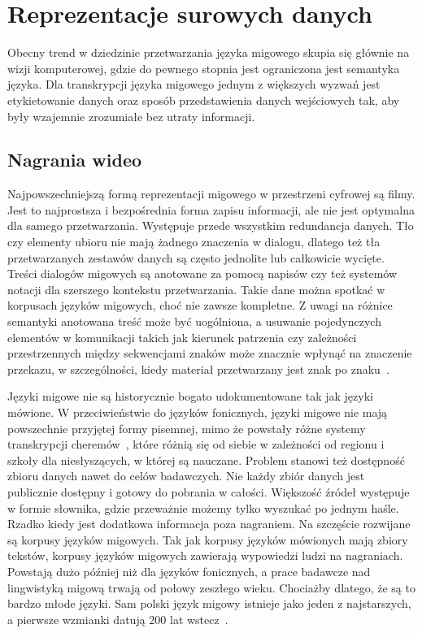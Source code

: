 \section{Reprezentacje surowych danych}
\label{sec:raw-data-representations}

Obecny trend w dziedzinie przetwarzania języka migowego skupia się głównie na wizji komputerowej, gdzie do pewnego stopnia jest ograniczona jest semantyka języka. Dla transkrypcji języka migowego jednym z większych wyzwań jest etykietowanie danych oraz sposób przedstawienia danych wejściowych tak, aby były wzajemnie zrozumiałe bez utraty informacji.

\subsection{Nagrania wideo}
\label{subsec:video-recordings}

Najpowszechniejszą formą reprezentacji migowego w przestrzeni cyfrowej są filmy. Jest to najprostsza i bezpośrednia forma zapisu informacji, ale nie jest optymalna dla samego przetwarzania. Występuje przede wszystkim redundancja danych. Tło czy elementy ubioru nie mają żadnego znaczenia w dialogu, dlatego też tła przetwarzanych zestawów danych są często jednolite lub całkowicie wycięte. Treści dialogów migowych są anotowane za pomocą napisów czy też systemów notacji dla szerszego kontekstu przetwarzania. Takie dane można spotkać w korpusach języków migowych, choć nie zawsze kompletne. Z uwagi na różnice semantyki anotowana treść może być uogólniona, a usuwanie pojedynczych elementów w komunikacji takich jak kierunek patrzenia czy zależności przestrzennych między sekwencjami znaków może znacznie wpłynąć na znaczenie przekazu, w szczególności, kiedy materiał przetwarzany jest znak po znaku~\cite{yin2020}.

Języki migowe nie są historycznie bogato udokumentowane tak jak języki mówione. W przeciwieństwie do języków fonicznych, języki migowe nie mają powszechnie przyjętej formy pisemnej, mimo że powstały różne systemy transkrypcji cheremów~\cite{stokoe1966}, które różnią się od siebie w zależności od regionu i szkoły dla niesłyszących, w której są nauczane. Problem stanowi też dostępność zbioru danych nawet do celów badawczych. Nie każdy zbiór danych jest publicznie dostępny i gotowy do pobrania w całości. Większość źródeł występuje w formie słownika, gdzie przeważnie możemy tylko wyszukać po jednym haśle. Rzadko kiedy jest dodatkowa informacja poza nagraniem. Na szczęście rozwijane są korpusy języków migowych. Tak jak korpusy języków mówionych mają zbiory tekstów, korpusy języków migowych zawierają wypowiedzi ludzi na nagraniach. Powstają dużo później niż dla języków fonicznych, a prace badawcze nad lingwistyką migową trwają od połowy zeszłego wieku. Chociażby dlatego, że są to bardzo młode języki. Sam polski język migowy istnieje jako jeden z najstarszych, a pierwsze wzmianki datują 200 lat wstecz~\cite{hollak1879}.

